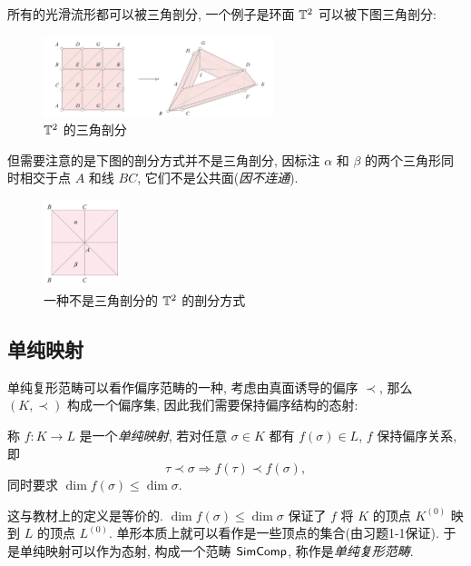     所有的光滑流形都可以被三角剖分, 一个例子是环面 $ \mathbb{T}^2 $ 可以被下图三角剖分:
    \begin{figure}[htbp]
        \centering
        \includegraphics[width=0.6\textwidth]{figures/Sec1_torus.png}
        \caption{$ \mathbb{T}^2 $ 的三角剖分}
    \end{figure}
    但需要注意的是下图的剖分方式并不是三角剖分, 因标注 $ \alpha $ 和 $ \beta $ 的两个三角形同时相交于点 $ A $ 和线 $ BC $, 它们不是公共面(\textit{因不连通}).
    \begin{figure}[htbp]
        \centering
        \includegraphics[width=0.2\textwidth]{figures/Sec1-2.png}
        \caption{一种不是三角剖分的 $ \mathbb{T}^2 $ 的剖分方式}
    \end{figure}

	\subsection{单纯映射}

	单纯复形范畴可以看作偏序范畴的一种, 考虑由真面诱导的偏序 $ \prec $, 那么 $ (K,\prec) $ 构成一个偏序集, 因此我们需要保持偏序结构的态射:

    \begin{Definition}[单纯映射]
        称 $ f : K\to L $ 是一个\emph{单纯映射}, 若对任意 $ \sigma\in K $ 都有 $ f(\sigma)\in L $, $ f $ 保持偏序关系, 即
        \[
            \tau\prec\sigma\Longrightarrow f(\tau)\prec f(\sigma),
        \]
        同时要求 $ \dim f(\sigma)\leqslant\dim\sigma $.
    \end{Definition}

    这与教材上的定义是等价的. $ \dim f(\sigma)\leqslant\dim\sigma $ 保证了 $ f $ 将 $ K $ 的顶点 $ K^{(0)} $ 映到 $ L $ 的顶点 $ L^{(0)} $. 单形本质上就可以看作是一些顶点的集合(由习题1-1保证). 于是单纯映射可以作为态射, 构成一个范畴 $ \mathsf{SimComp} $, 称作是\emph{单纯复形范畴}.

